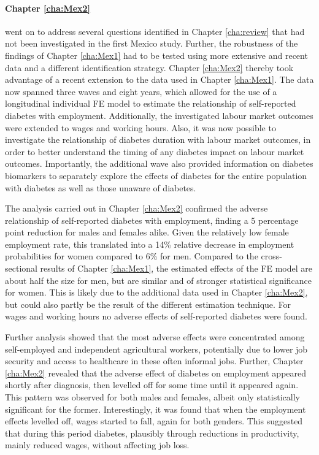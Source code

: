 \paragraph{Chapter \ref{cha:Mex2}}  went on to address several questions identified in Chapter \ref{cha:review} that had not been investigated in the first Mexico study. Further, the robustness of the findings of Chapter \ref{cha:Mex1} had to be tested using more extensive and recent data and a different identification strategy. Chapter \ref{cha:Mex2} thereby took advantage of a recent extension to the data used in Chapter \ref{cha:Mex1}. The data now spanned three waves and eight years, which allowed for the use of a longitudinal individual \ac{FE} model to estimate the relationship of self-reported diabetes with employment. Additionally, the investigated labour market outcomes were extended to wages and working hours. Also, it was now possible to investigate the relationship of diabetes duration with labour market outcomes, in order to better understand the timing of any diabetes impact on labour market outcomes. Importantly, the additional wave also provided information on diabetes biomarkers to separately explore the effects of diabetes for the entire population with diabetes as well as those unaware of diabetes.

The analysis carried out in Chapter \ref{cha:Mex2} confirmed the adverse relationship of self-reported diabetes with employment, finding a 5 percentage point reduction for males and females alike. Given the relatively low female employment rate, this translated into a 14\% relative decrease in employment probabilities for women compared to 6\% for men. Compared to the cross-sectional results of Chapter \ref{cha:Mex1}, the estimated effects of the \ac{FE} model are about half the size for men, but are similar and of stronger statistical significance for women. This is likely due to the additional data used in Chapter \ref{cha:Mex2}, but could also partly be the result of the different estimation technique. For wages and working hours no adverse effects of self-reported diabetes were found.

Further analysis showed that the most adverse effects were concentrated among self-employed and independent agricultural workers, potentially due to lower job security and access to healthcare in these often informal jobs. Further, Chapter \ref{cha:Mex2} revealed that the adverse effect of diabetes on employment appeared shortly after diagnosis, then levelled off for some time until it appeared again. This pattern was observed for both males and females, albeit only statistically significant for the former. Interestingly, it was found that when the employment effects levelled off, wages started to fall, again for both genders. This suggested that during this period diabetes, plausibly through reductions in productivity, mainly reduced wages, without affecting job loss.

